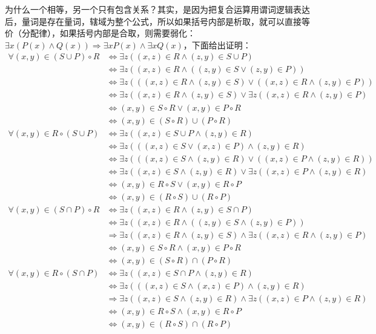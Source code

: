\documentclass[lang=cn,11pt]{elegantbook}
\begin{document}
为什么一个相等，另一个只有包含关系？其实，是因为把复合运算用谓词逻辑表达后，量词是存在量词，辖域为整个公式，所以如果括号内部是析取，就可以直接等价（分配律），如果括号内部是合取，则需要弱化：$\exists x(P(x) \land Q(x))\Rightarrow \exists xP(x)\land \exists xQ(x)$，下面给出证明：
\begin{align*}
\forall (x,y)\in(S\cup P)\circ R &\Leftrightarrow \exists z((x,z)\in R\land(z,y)\in S\cup P)\\
&\Leftrightarrow \exists z((x,z)\in R\land((z,y)\in S\lor (z,y)\in P))\\
&\Leftrightarrow \exists z(((x,z)\in R\land(z,y)\in S)\lor((x,z)\in R\land(z,y)\in P))\\
&\Leftrightarrow \exists z((x,z)\in R\land(z,y)\in S)\lor \exists z((x,z)\in R\land(z,y)\in P)\\
&\Leftrightarrow (x,y)\in S\circ R\lor (x,y)\in P\circ R\\
&\Leftrightarrow (x,y)\in (S\circ R)\cup(P\circ R)\\
\forall (x,y)\in R\circ(S\cup P) &\Leftrightarrow \exists z((x,z)\in S\cup P\land(z,y)\in R)\\
&\Leftrightarrow \exists z(((x,z)\in S\lor(x,z)\in P)\land(z,y)\in R)\\
&\Leftrightarrow \exists z(((x,z)\in S\land(z,y)\in R)\lor((x,z)\in P\land(z,y)\in R))\\
&\Leftrightarrow \exists z((x,z)\in S\land(z,y)\in R)\lor\exists z((x,z)\in P\land(z,y)\in R)\\
&\Leftrightarrow (x,y)\in R\circ S\lor(x,y)\in R\circ P\\
&\Leftrightarrow (x,y)\in (R\circ S)\cup(R\circ P)\\
\forall (x,y)\in(S\cap P)\circ R &\Leftrightarrow \exists z((x,z)\in R\land(z,y)\in S\cap P)\\
&\Leftrightarrow \exists z((x,z)\in R\land((z,y)\in S\land(z,y)\in P))\\
&\Rightarrow \exists z((x,z)\in R\land(z,y)\in S)\land\exists z((x,z)\in R\land(z,y)\in P)\\
&\Leftrightarrow (x,y)\in S\circ R\land(x,y)\in P\circ R\\
&\Leftrightarrow (x,y)\in (S\circ R)\cap(P\circ R)\\
\forall (x,y)\in R\circ(S\cap P) &\Leftrightarrow \exists z((x,z)\in S\cap P\land(z,y)\in R)\\
&\Leftrightarrow \exists z(((x,z)\in S\land(x,z)\in P)\land(z,y)\in R)\\
&\Rightarrow \exists z((x,z)\in S\land(z,y)\in R)\land\exists z((x,z)\in P\land(z,y)\in R)\\
&\Leftrightarrow (x,y)\in R\circ S\land(x,y)\in R\circ P\\
&\Leftrightarrow (x,y)\in (R\circ S)\cap(R\circ P)
\end{align*}
\end{document}
